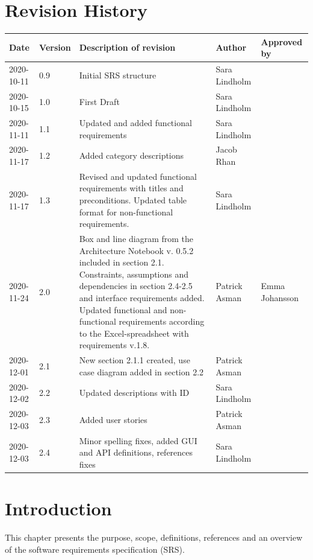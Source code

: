 \documentclass{scrreprt}
\begin{document}
\chapter*{Revision History}
\begin{center}
\begin{tabular}{|p{}|p{}|p{4.6cm}|p{2.5cm}|p{2.5cm}|}
 \hline
 \textbf{Date} & \textbf{Version} & \textbf{Description of revision} & \textbf{Author} & \textbf{Approved by} \\ 
 \hline
 2020-10-11 & 0.9 & Initial SRS structure & Sara Lindholm & \\
 \hline
 2020-10-15 & 1.0 & First Draft & Sara Lindholm & \\ 
 \hline
 2020-11-11 & 1.1 & Updated and added functional requirements & Sara Lindholm & \\
 \hline
 2020-11-17 & 1.2 & Added category descriptions & Jacob Rhan & \\
 \hline
 2020-11-17 & 1.3 & Revised and updated functional requirements with titles and preconditions. Updated table format for non-functional requirements. & Sara Lindholm & \\
 \hline 
 2020-11-24 & 2.0 & Box and line diagram from the Architecture Notebook v. 0.5.2 included in section 2.1. Constraints, assumptions and dependencies in section 2.4-2.5 and interface requirements added. Updated functional and non-functional requirements according to the Excel-spreadsheet with requirements v.1.8. & Patrick Asman & Emma Johansson \\
 \hline
 2020-12-01 & 2.1 & New section 2.1.1 created, use case diagram added in section 2.2 & Patrick Asman & \\
 \hline 
 2020-12-02 & 2.2 & Updated descriptions with ID & Sara Lindholm & \\
 \hline 
 2020-12-03 & 2.3 & Added user stories & Patrick Asman & \\ 
 \hline 
 2020-12-03 & 2.4 & Minor spelling fixes, added GUI and API definitions, references fixes & Sara Lindholm & \\ 
 \hline 
\end{tabular}
\end{center}

\tableofcontents

\chapter{Introduction}
This chapter presents the purpose, scope, definitions, references and an overview of the software requirements specification (SRS). 
\end{document}
